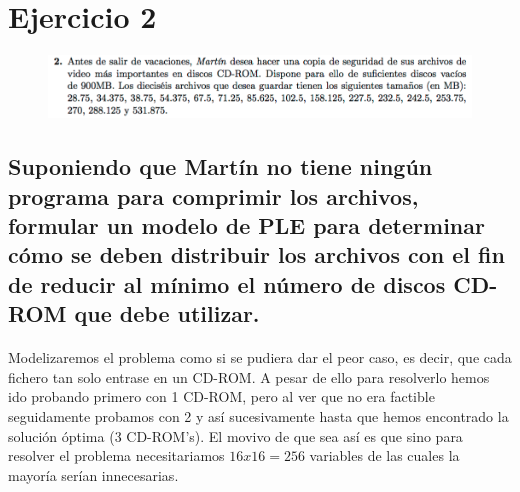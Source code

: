 \documentclass[10pt, a4paper]{article}
\begin{document}
			\paragraph{}



	\section{Ejercicio 2}

        \begin{figure}[H]
        \centering
            \includegraphics[width=\textwidth]{res/exercise-2.png}
        \end{figure}


		\subsection{Suponiendo que Martín no tiene ningún programa para comprimir los archivos, formular un modelo de PLE para determinar cómo se deben distribuir los archivos con el fin de reducir al mínimo el número de discos CD-ROM que debe utilizar.}

			\paragraph{}
			Modelizaremos el problema como si se pudiera dar el peor caso, es decir, que cada fichero tan solo entrase en un CD-ROM. A pesar de ello para resolverlo hemos ido probando primero con 1 CD-ROM, pero al ver que no era factible seguidamente probamos con 2 y así sucesivamente hasta que hemos encontrado la solución óptima (3 CD-ROM's). El movivo de que sea así es que sino para resolver el problema necesitariamos $16 x 16 = 256$ variables de las cuales la mayoría serían innecesarias.
\end{document}
